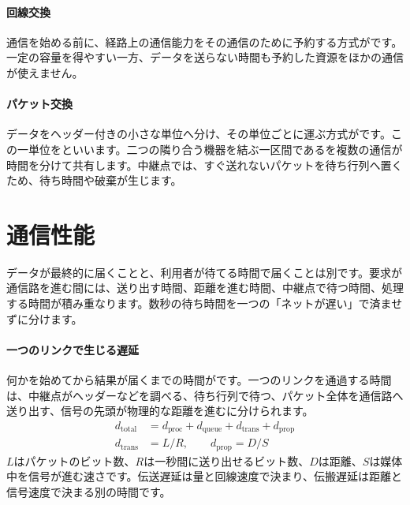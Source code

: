 \par
\endgroup
\medskip
\begingroup
\paragraph{回線交換}
        通信を始める前に、経路上の通信能力をその通信のために予約する方式がです。一定の容量を得やすい一方、データを送らない時間も予約した資源をほかの通信が使えません。

\paragraph{パケット交換}
        データをヘッダー付きの小さな単位へ分け、その単位ごとに運ぶ方式がです。この一単位をといいます。二つの隣り合う機器を結ぶ一区間であるを複数の通信が時間を分けて共有します。中継点では、すぐ送れないパケットを待ち行列へ置くため、待ち時間や破棄が生じます。

\par
\endgroup
\par
\endgroup


\section{通信性能}
\label{sec:05-network-02}

データが最終的に届くことと、利用者が待てる時間で届くことは別です。要求が通信路を進む間には、送り出す時間、距離を進む時間、中継点で待つ時間、処理する時間が積み重なります。数秒の待ち時間を一つの「ネットが遅い」で済ませずに分けます。

\begingroup
\begingroup
\paragraph{一つのリンクで生じる遅延}
        何かを始めてから結果が届くまでの時間がです。一つのリンクを通過する時間は、中継点がヘッダーなどを調べる、待ち行列で待つ、パケット全体を通信路へ送り出す、信号の先頭が物理的な距離を進むに分けられます。
        \begin{align*}
          d_{\mathrm{total}} &=
          d_{\mathrm{proc}}+d_{\mathrm{queue}}+
          d_{\mathrm{trans}}+d_{\mathrm{prop}}\\
          d_{\mathrm{trans}} &= L/R,\qquad
          d_{\mathrm{prop}} = D/S
        \end{align*}
        $L$はパケットのビット数、$R$は一秒間に送り出せるビット数、$D$は距離、$S$は媒体中を信号が進む速さです。伝送遅延は量と回線速度で決まり、伝搬遅延は距離と信号速度で決まる別の時間です。

